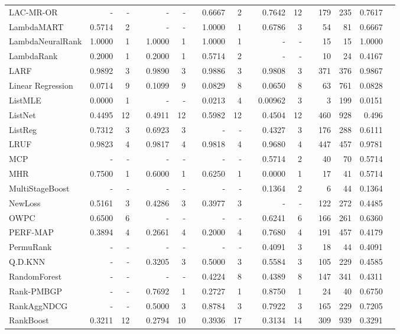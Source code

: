 \documentclass{sig-alternate-2013}
\begin{document}
\begin{longtable}[!hp]{@{}lrrrrrrrrrrrrrrrr@{}}
LAC-MR-OR & - & - && - & - && 0.6667 & 2 && 0.7642 & 12 && 179 & 235 & 0.7617 \\
LambdaMART & 0.5714 & 2 && - & - && 1.0000 & 1 && 0.6786 & 3 && 54 & 81 & 0.6667 \\
LambdaNeuralRank & 1.0000 & 1 && 1.0000 & 1 && 1.0000 & 1 && - & - && 15 & 15 & 1.0000 \\
LambdaRank & 0.2000 & 1 && 0.2000 & 1 && 0.5714 & 2 && - & - && 10 & 24 & 0.4167 \\
LARF & 0.9892 & 3 && 0.9890 & 3 && 0.9886 & 3 && 0.9808 & 3 && 371 & 376 & 0.9867 \\
Linear Regression & 0.0714 & 9 && 0.1099 & 9 && 0.0829 & 8 && 0.0650 & 8 && 63 & 761 & 0.0828 \\
ListMLE & 0.0000 & 1 && - & - && 0.0213 & 4 && 0.00962 & 3 && 3 & 199 & 0.0151 \\
ListNet & 0.4495 & 12 && 0.4911 & 12 && 0.5982 & 12 && 0.4504 & 12 && 460 & 928 & 0.496 \\
ListReg & 0.7312 & 3 && 0.6923 & 3 && - & - && 0.4327 & 3 && 176 & 288 & 0.6111 \\
LRUF & 0.9823 & 4 && 0.9817 & 4 && 0.9818 & 4 && 0.9680 & 4 && 447 & 457 & 0.9781 \\
MCP & - & - && - & - && - & - && 0.5714 & 2 && 40 & 70 & 0.5714 \\
MHR & 0.7500 & 1 && 0.6000 & 1 && 0.6250 & 1 && 0.0000 & 1 && 17 & 41 & 0.5714 \\
MultiStageBoost & - & - && - & - && - & - && 0.1364 & 2 && 6 & 44 & 0.1364 \\
NewLoss & 0.5161 & 3 && 0.4286 & 3 && 0.3977 & 3 && - & - && 122 & 272 & 0.4485 \\
OWPC & 0.6500 & 6 && - & - && - & - && 0.6241 & 6 && 166 & 261 & 0.6360 \\
PERF-MAP & 0.3894 & 4 && 0.2661 & 4 && 0.2000 & 4 && 0.7680 & 4 && 191 & 457 & 0.4179 \\
PermuRank & - & - && - & - && - & - && 0.4091 & 3 && 18 & 44 & 0.4091 \\
Q.D.KNN & - & - && 0.3205 & 3 && 0.5000 & 3 && 0.5584 & 3 && 105 & 229 & 0.4585 \\
RandomForest & - & - && - & - && 0.4224 & 8 && 0.4389 & 8 && 147 & 341 & 0.4311 \\
Rank-PMBGP & - & - && 0.7692 & 1 && 0.2727 & 1 && 0.8750 & 1 && 24 & 40 & 0.6750 \\
RankAggNDCG & - & - && 0.5000 & 3 && 0.8784 & 3 && 0.7922 & 3 && 165 & 229 & 0.7205 \\
RankBoost & 0.3211 & 12 && 0.2794 & 10 && 0.3936 & 17 && 0.3134 & 14 && 309 & 939 & 0.3291 \\

\end{longtable}
\end{document}
